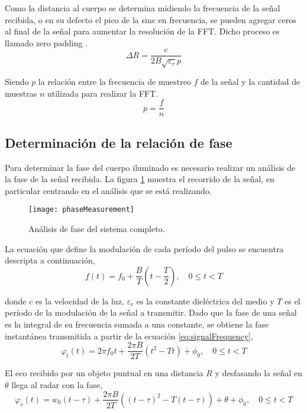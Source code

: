 Como la distancia al cuerpo se determina midiendo la frecuencia de la señal recibida, o en su defecto el pico de la sinc en frecuencia, se pueden agregar ceros al final de la señal para aumentar la resolución de la FFT. Dicho proceso es llamado zero padding \cite{Oppenheim1990}.
\begin{equation}\label{eq:resolutionDistance2}
  \Delta R = \dfrac{c}{2B\sqrt{\varepsilon_r}p}
\end{equation}

Siendo $p$ la relación entre la frecuencia de muestreo $f$ de la señal y la cantidad de muestras $n$ utilizada para realizar la FFT.
\begin{equation}
  p = \frac{f}{n}
\end{equation}


\subsection{Determinación de la relación de fase}

Para determinar la fase del cuerpo iluminado es necesario realizar un análisis de la fase de la señal recibida. La figura \ref{fig:phaseSystem} muestra el recorrido de la señal, en particular centrando en el análisis que se está realizando.
\begin{figure}[htb]
 \centering
 \texttt{[image: phaseMeasurement]}
 \caption{Análisis de fase del sistema completo.}
 \label{fig:phaseSystem}
\end{figure}

La ecuación que define la modulación de cada período del pulso se encuentra descripta a continuación,
\begin{equation}
  f(t) = f_0 + \dfrac{B}{T}(t-\dfrac{T}{2}),\quad 0 \le t < T
  \label{eq:signalFrequency}
\end{equation}

donde $c$ es la velocidad de la luz, $\varepsilon_r$ es la constante dieléctrica del medio \cite{Brennan2014a} y $T$ es el período de la modulación de la señal a transmitir. Dado que la fase de una señal es la integral de su frecuencia sumada a una constante, se obtiene la fase instantánea transmitida a partir de la ecuación \ref{eq:signalFrequency},
\begin{equation}
  \varphi_t(t) = 2\pi f_0t + \dfrac{2\pi B}{2T}(t^2-Tt) + \phi_0,\quad 0 \le t < T
  \label{eq:signalFrequency2}
\end{equation}

El eco recibido por un objeto puntual en una distancia $R$ y desfasando la señal en $\theta$ llega al radar con la fase,
\begin{equation}
  \varphi_r(t) = w_0(t-\tau) + \dfrac{2\pi B}{2T}((t - \tau)^2-T(t - \tau)) + \theta + \phi_0,\quad 0 \le t < T
  \label{eq:signalFrequency3}
\end{equation}

